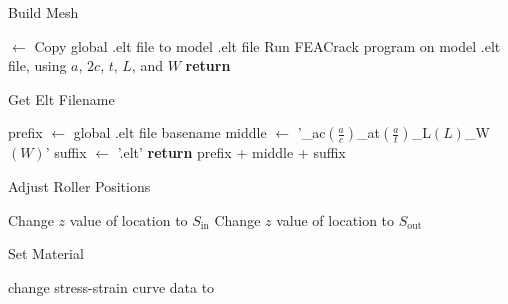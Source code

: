 \documentclass{article}
\begin{document}
\begin{algorithm}
  \caption{Build Mesh}
  \label{build_mesh}
  \begin{algorithmic}
       $\gets$  
      \State Copy {global .elt file} to {model .elt file}
        \State {}
      \EndIf
      \State Run FEACrack program on model .elt file, using $a$, $2c$, $t$, $L$, and $W$
      \State \textbf{return}  
    \EndProcedure
  \end{algorithmic}
\end{algorithm}

\begin{algorithm}
  \caption{Get Elt Filename}
  \label{get_elt_filename}
  \begin{algorithmic}
      \State prefix $\gets$ global .elt file basename 
      \State middle $\gets$ '\_ac$(\frac{a}{c})$\_at$(\frac{a}{t})$\_L$(L)$\_W$(W)$'
      \State suffix $\gets$ '.elt'
      \State \textbf{return} prefix + middle + suffix 
    \EndProcedure
  \end{algorithmic}
\end{algorithm}

\begin{algorithm}
  \caption{Adjust Roller Positions}
  \label{adjust_roller_positions}
  \begin{algorithmic}
      \State Change $z$ value of location to $S_{\text{in}}$
    \EndIf
      \State Change $z$ value of location to $S_{\text{out}}$
    \EndIf
    \EndProcedure
  \end{algorithmic}
\end{algorithm}

\begin{algorithm}
  \caption{Set Material}
  \label{set_material}
  \begin{algorithmic}
      \State change stress-strain curve data to 
    \EndIf
    \EndProcedure
  \end{algorithmic}
\end{algorithm}
\end{document}
